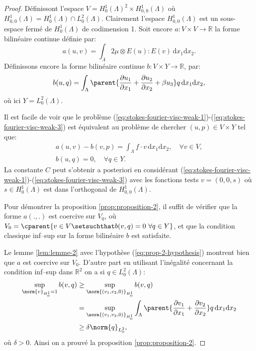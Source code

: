 \begin{proof}
  Définissont l'espace $V = H_0^1(\Lambda)^2\times
  H_{0,0}^1(\Lambda)$ où $H_{0,0}^1(\Lambda) = H_0^1(\Lambda) \cap
  L_0^2(\Lambda)$. Clairement l'espace $H_{0,0}^1(\Lambda)$ est un
  sous-espace fermé de $H_0^1(\Lambda)$ de codimension 1. Soit
  encore $a:V\times V\to \mathbb R$ la forme bilinéaire continue
  définie par:
  \begin{equation}
    a(u,v) = \int_\Lambda 2\mu\otimes E(u):E(v)\,\mathrm dx_1\mathrm dx_2.
  \end{equation}
  Définissons encore la forme bilinéaire continue $b:V\times Y\to\mathbb R$, par:
  \begin{equation}
    b(u, q) = \int_\Lambda \parent{\frac{\partial u_1}{\partial x_1} %
      + \frac{\partial u_2}{\partial x_2} %
      + \beta u_3}q\,\mathrm dx_1\mathrm dx_2,
  \end{equation}
  où ici $Y = L_0^2(\Lambda)$.

  Il est facile de voir que le problème
  (\ref{eq:stokes-fourier-visc-weak-1})-(\ref{eq:stokes-fourier-visc-weak-3})
  est équivalent au problème de chercher $(u,p)\in V\times Y$ tel
  que:
  \begin{equation}
    \begin{split}
      a(u,v) - b(v, p) = \int_\Lambda f\cdot v\,\mathrm dx_1\mathrm dx_2,%
        \quad \forall v\in V,\\
      b(u,q) = 0,%
        \quad \forall q\in Y.
    \end{split}
  \end{equation}
  La constante $C$ peut s'obtenir a posteriori en considérant
  (\ref{eq:stokes-fourier-visc-weak-1})-(\ref{eq:stokes-fourier-visc-weak-3})
  avec les fonctions tests $v = (0,0,s)$ où $s\in H_0^1(\Lambda)$
  est dans l'orthogonal de $H_{0,0}^1(\Lambda)$.

  Pour démontrer la proposition \ref{prop:proposition-2}, il suffit
  de vérifier que la forme $a(.,.)$ est coercive sur $V_0$, où
  $V_0 = \cparent{v\in V\setsuchthat b(v,q) = 0\ \forall q\in Y}$, et
  que la condition classique inf--sup sur la forme bilinéaire $b$
  est satisfaite.

  Le lemme \ref{lem:lemme-2} avec l'hypothèse
  (\ref{eq:prop-2-hypothesis}) montrent bien que $a$ est coercive sur
  $V_0$. D'autre part en utilisant l'inégalité concernant la
  condition inf--sup dans $\mathbb R^2$ on a si $q\in L_0^2(\Lambda)$:
  \begin{equation}
    \begin{split}
      \sup_{\norm{v}_{H_0^1} = 1}b(v,q) %
      &\geq \sup_{\norm{(v_1, v_2, 0)}_{H_0^1}}b(v,q)\\
      &= \sup_{\norm{(v_1, v_2, 0)}_{H_0^1}}\int_\Lambda \parent{\frac{\partial v_1}{\partial x_1} %
        + \frac{\partial v_2}{\partial x_2}}q\,\mathrm dx_1\mathrm dx_2\\
      &\geq \delta \norm{q}_{L_0^2},
    \end{split}
  \end{equation}
  où $\delta > 0$. Ainsi on a prouvé la proposition \ref{prop:proposition-2}.
\end{proof}
